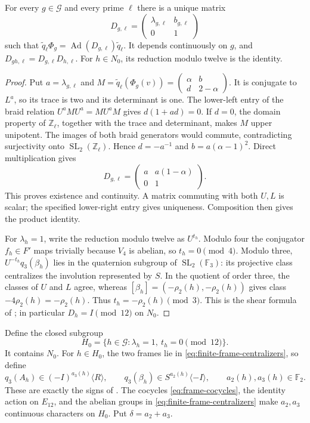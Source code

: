 \begin{lemma}\label{lem:frame-all-multipliers-congruence}
For every $g\in\mathcal G$ and every prime $\ell$ there is a unique
matrix
\[
 D_{g,\ell}=\begin{pmatrix}\lambda_{g,\ell}&b_{g,\ell}\\0&1\end{pmatrix}
\]
such that
$\widetilde q_\ell\Phi_g=\operatorname{Ad}(D_{g,\ell})\widetilde q_\ell$.
It depends continuously on $g$, and $D_{gh,\ell}=D_{g,\ell}D_{h,\ell}$.
For $h\in N_0$, its reduction modulo twelve is the identity.
\end{lemma}

\begin{proof}
Put $a=\lambda_{g,\ell}$ and
$M=\widetilde q_\ell(\Phi_g(v))=
\left(\begin{smallmatrix}\alpha&b\\d&2-\alpha\end{smallmatrix}\right)$.
It is conjugate to $L^a$, so its trace is two and its determinant
is one. The lower-left entry of the braid relation
$U^aMU^a=MU^aM$ gives $d(1+ad)=0$.
If $d=0$, the domain property of $\mathbb Z_\ell$, together with
the trace and determinant, makes $M$ upper unipotent. The images
of both braid generators would commute, contradicting surjectivity
onto $\operatorname{SL}_2(\mathbb Z_\ell)$. Hence $d=-a^{-1}$
and $b=a(\alpha-1)^2$. Direct multiplication gives
\[
 D_{g,\ell}=
  \begin{pmatrix}a&a(1-\alpha)\\0&1\end{pmatrix}.
\]
This proves existence and continuity. A matrix commuting with both
$U,L$ is scalar; the specified lower-right entry gives uniqueness.
Composition then gives the product identity.

For $\lambda_h=1$, write the reduction modulo twelve as $U^{t_h}$.
Modulo four the conjugator $f_h\in F'$ maps trivially because
$V_4$ is abelian, so $t_h=0\pmod4$. Modulo three,
$U^{-t_h}q_3(\beta_h)$ lies in the quaternion subgroup of
$\operatorname{SL}_2(\mathbb F_3)$: its projective class centralizes
the involution represented by $S$. In the quotient of order three,
the classes of $U$ and $L$ agree, whereas
$[\beta_h]=(-\rho_2(h),-\rho_2(h))$ gives class
$-4\rho_2(h)=-\rho_2(h)$. Thus
$t_h=-\rho_2(h)\pmod3$. This is the shear formula of
\cite[Lemma~13]{H17}; in particular $D_h=I\pmod{12}$ on $N_0$.
\end{proof}

Define the closed subgroup
\[
 H_0=\{h\in\mathcal G:\lambda_h=1,\ t_h=0\pmod{12}\}.
\]
It contains $N_0$. For $h\in H_0$, the two frames lie in
\eqref{eq:finite-frame-centralizers}, so define
\begin{equation}
 q_3(A_h)\in(-I)^{a_3(h)}\langle R\rangle,
 \qquad
 q_3(\beta_h)\in S^{a_2(h)}\langle-I\rangle,
 \qquad a_2(h),a_3(h)\in\mathbb F_2.
 \label{eq:frame-sign-definition}
\end{equation}
These are exactly the signs of \cite[Definition~14]{H17}.
The cocycles \eqref{eq:frame-cocycles}, the identity action on
$E_{12}$, and the abelian groups in
\eqref{eq:finite-frame-centralizers} make $a_2,a_3$ continuous
characters on $H_0$. Put $\delta=a_2+a_3$.

